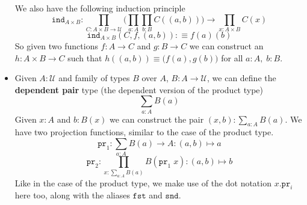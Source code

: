 \documentclass[12pt]{report}
\theoremstyle{definition}
\begin{document}
\begin{itemize}
	We also have the following induction principle
	$$\mathtt{ind}_{A\times B} : \prod_{C: A\times B \rightarrow \mathcal{U}}\big( \prod_{a:A}\prod_{b:B} C((a,b)) \big) \rightarrow \prod_{x: A\times B} C(x)$$
	$$\mathtt{ind}_{A\times B}(C, f, (a,b)) : \equiv f(a)(b)$$
	So given two functions $f: A\rightarrow C$ and $g : B \rightarrow C$ we can construct an $h : A\times B \rightarrow C$ such that $h((a,b)) \equiv \big(f(a), g(b)\big)$ for all $a:A,\; b:B$.
	\item Given $A : \mathcal{U}$ and family of types $B$ over $A$, $B : A \rightarrow \mathcal{U}$, we can define the \textbf{dependent pair} type (the dependent version of the product type)
	$$\sum_{a : A} B(a)$$
	Given $x : A$ and $b : B(x)$ we can construct the pair $(x,b) : \sum_{a : A} B(a)$. 
	We have two projection functions, similar to the case of the product type.
	$$\mathtt{pr}_1 : \sum_{a:A}B(a) \rightarrow A : (a,b) \mapsto a$$
	$$\mathtt{pr}_2 : \prod_{x : \sum_{a:A}B(a)}B(\mathtt{pr}_1\; x) : (a,b) \mapsto b$$
	Like in the case of the product type, we make use of the dot notation $x.\mathtt{pr}_i$ here too, along with the aliases $\mathtt{fst}$ and $\mathtt{snd}$. 


\end{itemize}
\end{document}
